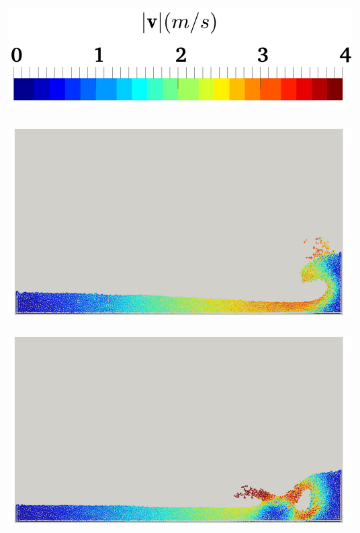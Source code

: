 \begin{figure}[H]
	\centering    
	\begin{subfigure}{0.35\columnwidth}    
		\centering
		\includegraphics[width=1.0\textwidth]{images/SPH_Comparison/colorBar.png}
	\end{subfigure}
	
	\begin{subfigure}{0.4\columnwidth}    
		\centering
		\includegraphics[width=1.0\textwidth]{images/SPH_Comparison/cf_1.png}
	\end{subfigure}
	\begin{subfigure}{0.4\columnwidth}
		\centering
		\includegraphics[width=1.0\textwidth]{images/SPH_Comparison/cf_2.png}
	\end{subfigure}

\end{figure}
